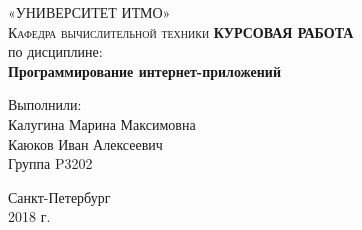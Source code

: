 \begin{titlepage}
\begin{center}

\textsc{«УНИВЕРСИТЕТ ИТМО»\\[4mm]
Кафедра вычислительной техники}
\vfill
\textbf{КУРСОВАЯ РАБОТА}\\[4mm]
по дисциплине:\\[2mm]
\textbf{Программирование интернет-приложений}\\[16mm]
\end{center}

\begin{flushright}
Выполнили: \\[4mm]
Калугина Марина Максимовна \\[2mm]
Каюков Иван Алексеевич \\[2mm]
Группа P3202
\end{flushright}

\begin{center}
\vfill
Санкт-Петербург\\[2mm]
2018 г.

\end{center}
\end{titlepage}
